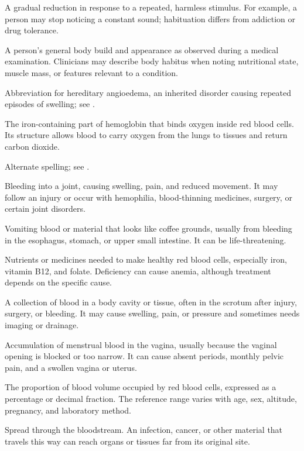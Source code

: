  A gradual reduction in response to a repeated, harmless stimulus. For example, a person may stop noticing a constant sound; habituation differs from addiction or drug tolerance.

 A person’s general body build and appearance as observed during a medical examination. Clinicians may describe body habitus when noting nutritional state, muscle mass, or features relevant to a condition.

 Abbreviation for hereditary angioedema, an inherited disorder causing repeated episodes of swelling; see .

 The iron-containing part of hemoglobin that binds oxygen inside red blood cells. Its structure allows blood to carry oxygen from the lungs to tissues and return carbon dioxide.

 Alternate spelling; see .

 Bleeding into a joint, causing swelling, pain, and reduced movement. It may follow an injury or occur with hemophilia, blood-thinning medicines, surgery, or certain joint disorders.

 Vomiting blood or material that looks like coffee grounds, usually from bleeding in the esophagus, stomach, or upper small intestine. It can be life-threatening.

 Nutrients or medicines needed to make healthy red blood cells, especially iron, vitamin B12, and folate. Deficiency can cause anemia, although treatment depends on the specific cause.

 A collection of blood in a body cavity or tissue, often in the scrotum after injury, surgery, or bleeding. It may cause swelling, pain, or pressure and sometimes needs imaging or drainage.

 Accumulation of menstrual blood in the vagina, usually because the vaginal opening is blocked or too narrow. It can cause absent periods, monthly pelvic pain, and a swollen vagina or uterus.

 The proportion of blood volume occupied by red blood cells, expressed as a percentage or decimal fraction. The reference range varies with age, sex, altitude, pregnancy, and laboratory method.

 Spread through the bloodstream. An infection, cancer, or other material that travels this way can reach organs or tissues far from its original site.


